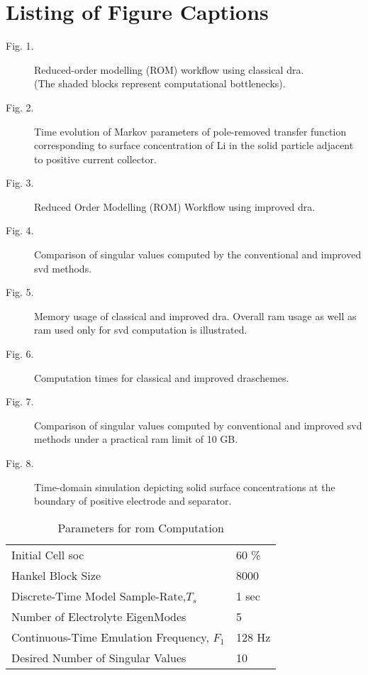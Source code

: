 \section*{Listing of Figure Captions}

\begin{description}
	\item[Fig. 1.]   Reduced-order modelling (ROM) workflow using classical \gls{dra}.\\ (The shaded blocks represent computational bottlenecks).\\
	\item[Fig. 2.]   Time evolution of Markov parameters of pole-removed transfer function corresponding to surface concentration of Li in the solid particle adjacent to positive current collector.\\
	\item[Fig. 3.]   Reduced Order Modelling (ROM) Workflow using improved \gls{dra}.\\
	\item[Fig. 4.]   Comparison of singular values computed by the conventional and improved \gls{svd} methods.\\
	\item[Fig. 5.]	 Memory usage of classical and improved \gls{dra}. Overall \gls{ram} usage as well as \gls{ram} used only for \gls{svd} computation is illustrated.\\
	\item[Fig. 6.] 	 Computation times for classical and improved \gls{dra}schemes.\\
	\item[Fig. 7.]	 Comparison of singular values computed by conventional and improved \gls{svd} methods under a practical \gls{ram} limit of 10 GB.\\
	\item[Fig. 8.]	 Time-domain simulation depicting solid surface concentrations at the boundary of positive electrode and separator.\\
\end{description}

\newpage
\singlespacing
\begin{table}[h]
	\begin{center}
		\caption{Parameters for \gls{rom} Computation}
		\label{table:simparams}
		\begin{tabular}{ l l }
			\hline
			Initial Cell \gls{soc} & 60 \%  \\
			Hankel Block Size & 8000 \\
			Discrete-Time Model Sample-Rate,$T_s$ & 1 sec  \\
			Number of Electrolyte EigenModes & 5 \\
			Continuous-Time Emulation Frequency, $F_1$ & 128 Hz \\
			Desired Number of Singular Values &	10 \\
			\hline
		\end{tabular}
	\end{center}
\end{table}

